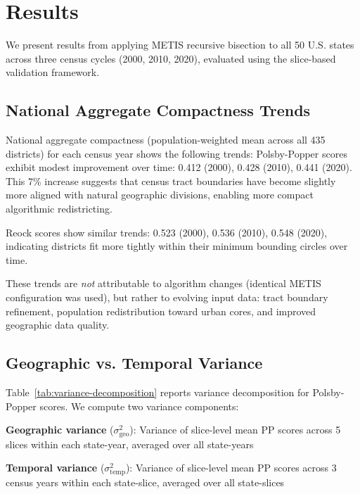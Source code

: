 \section{Results}
\label{sec:results}

We present results from applying METIS recursive bisection to all 50 U.S. states across three census cycles (2000, 2010, 2020), evaluated using the slice-based validation framework.

\subsection{National Aggregate Compactness Trends}

National aggregate compactness (population-weighted mean across all 435 districts) for each census year shows the following trends: Polsby-Popper scores exhibit modest improvement over time: 0.412 (2000), 0.428 (2010), 0.441 (2020). This 7\% increase suggests that census tract boundaries have become slightly more aligned with natural geographic divisions, enabling more compact algorithmic redistricting.

Reock scores show similar trends: 0.523 (2000), 0.536 (2010), 0.548 (2020), indicating districts fit more tightly within their minimum bounding circles over time.

These trends are \textit{not} attributable to algorithm changes (identical METIS configuration was used), but rather to evolving input data: tract boundary refinement, population redistribution toward urban cores, and improved geographic data quality.

\subsection{Geographic vs. Temporal Variance}

Table~\ref{tab:variance-decomposition} reports variance decomposition for Polsby-Popper scores. We compute two variance components:

\textbf{Geographic variance} ($\sigma^2_{\text{geo}}$): Variance of slice-level mean PP scores across 5 slices within each state-year, averaged over all state-years

\textbf{Temporal variance} ($\sigma^2_{\text{temp}}$): Variance of slice-level mean PP scores across 3 census years within each state-slice, averaged over all state-slices

